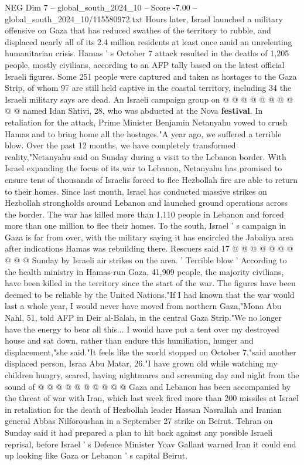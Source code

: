 \begin{textsample}{NEG Dim 7 – global\_south\_2024\_10 – Score -7.00 – global\_south\_2024\_10/115580972.txt}
Hours later, Israel launched a military offensive on Gaza that has reduced swathes of the territory to rubble, and displaced nearly all of its 2.4 million residents at least once amid an unrelenting humanitarian crisis.
Hamas ' s October 7 attack resulted in the deaths of 1,205 people, mostly civilians, according to an AFP tally based on the latest official Israeli figures.
Some 251 people were captured and taken as hostages to the Gaza Strip, of whom 97 are still held captive in the coastal territory, including 34 the Israeli military says are dead.
An Israeli campaign group on @ @ @ @ @ @ @ @ @ @ named Idan Shtivi, 28, who was abducted at the Nova \textbf{festival}.
In retaliation for the attack, Prime Minister Benjamin Netanyahu vowed to crush Hamas and to bring home all the hostages."A year ago, we suffered a terrible blow.
Over the past 12 months, we have completely transformed reality,"Netanyahu said on Sunday during a visit to the Lebanon border.
With Israel expanding the focus of its war to Lebanon, Netanyahu has promised to ensure tens of thousands of Israelis forced to flee Hezbollah fire are able to return to their homes.
Since last month, Israel has conducted massive strikes on Hezbollah strongholds around Lebanon and launched ground operations across the border.
The war has killed more than 1,110 people in Lebanon and forced more than one million to flee their homes.
To the south, Israel ' s campaign in Gaza is far from over, with the military saying it has encircled the Jabaliya area after indications Hamas was rebuilding there.
Rescuers said 17 @ @ @ @ @ @ @ @ @ @ Sunday by Israeli air strikes on the area. ' Terrible blow ' According to the health ministry in Hamas-run Gaza, 41,909 people, the majority civilians, have been killed in the territory since the start of the war.
The figures have been deemed to be reliable by the United Nations."If I had known that the war would last a whole year, I would never have moved from northern Gaza,"Mona Abu Nahl, 51, told AFP in Deir al-Balah, in the central Gaza Strip."We no longer have the energy to bear all this...
I would have put a tent over my destroyed house and sat down, rather than endure this humiliation, hunger and displacement,"she said."It feels like the world stopped on October 7,"said another displaced person, Israa Abu Matar, 26."I have grown old while watching my children hungry, scared, having nightmares and screaming day and night from the sound of @ @ @ @ @ @ @ @ @ @ Gaza and Lebanon has been accompanied by the threat of war with Iran, which last week fired more than 200 missiles at Israel in retaliation for the death of Hezbollah leader Hassan Nasrallah and Iranian general Abbas Nilforoushan in a September 27 strike on Beirut.
Tehran on Sunday said it had prepared a plan to hit back against any possible Israeli reprisal, before Israel ' s Defence Minister Yoav Gallant warned Iran it could end up looking like Gaza or Lebanon ' s capital Beirut.

\end{textsample}
